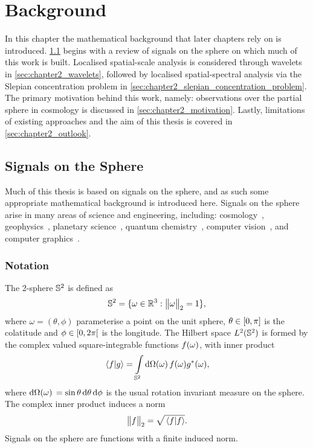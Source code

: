 \chapter{Background}\label{sec:chapter2}

In this chapter the mathematical background that later chapters rely on is introduced.
\cref{sec:chapter2_signals_sphere} begins with a review of signals on the sphere on which much of this work is built.
Localised spatial-scale analysis is considered through wavelets in \cref{sec:chapter2_wavelets}, followed by localised spatial-spectral analysis via the Slepian concentration problem in \cref{sec:chapter2_slepian_concentration_problem}.
The primary motivation behind this work, namely: observations over the partial sphere in cosmology is discussed in \cref{sec:chapter2_motivation}.
Lastly, limitations of existing approaches and the aim of this thesis is covered in \cref{sec:chapter2_outlook}.

\section{Signals on the Sphere}\label{sec:chapter2_signals_sphere}

Much of this thesis is based on signals on the sphere, and as such some appropriate mathematical background is introduced here.
Signals on the sphere arise in many areas of science and engineering, including: cosmology~\cite{Bennett1996}, geophysics~\cite{Simons2006}, planetary science~\cite{Turcotte1981}, quantum chemistry~\cite{Choi1999}, computer vision~\cite{Cohen2018,Esteves2020,Cobb2021}, and computer graphics~\cite{Ramamoorthi2004}.

\subsection{Notation}

The 2-sphere \(\mathbb{S}^{2}{}\) is defined as
%
\begin{equation}
	\mathbb{S}^{2}{}
	= \{\omega \in \mathbb{R}^{3} : {\big\lVert\omega\big\rVert}_{2} = 1\},
\end{equation}
%
where \(\omega=(\theta,\phi)\) parameterise a point on the unit sphere, \(\theta \in \interval{0}{\pi}\) is the colatitude and \(\phi \in \interval[open right]{0}{2\pi}\) is the longitude.
The Hilbert space \(L^{2}(\mathbb{S}^{2})\) is formed by the complex valued square-integrable functions \(f(\omega)\), with inner product
%
\begin{equation}
	\braket*{f}{g}
	= \displaystyle\int\limits_{\mathbb{S}^{2}} \dd{\Omega(\omega)} f(\omega) g^{\ast}(\omega),
\end{equation}
%
where \(\dd{\Omega(\omega)}{} = \sin{\theta} \dd{\theta} \dd{\phi}\) is the usual rotation invariant measure on the sphere.
The complex inner product induces a norm
%
\begin{equation}
	{\big\lVert f\big\rVert}_{2}
	= \sqrt{\braket*{f}}.
\end{equation}
%
Signals on the sphere are functions with a finite induced norm.

